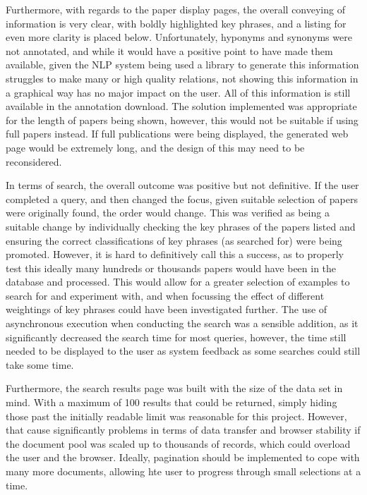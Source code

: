 Furthermore, with regards to the paper display pages, the overall conveying of information is very clear, with boldly highlighted key phrases, and a listing for even more clarity is placed below. Unfortunately, hyponyms and synonyms were not annotated, and while it would have a positive point to have made them available, given the NLP system being used a library to generate this information struggles to make many or high quality relations, not showing this information in a graphical way has no major impact on the user. All of this information is still available in the annotation download. The solution implemented was appropriate for the length of papers being shown, however, this would not be suitable if using full papers instead. If full publications were being displayed, the generated web page would be extremely long, and the design of this may need to be reconsidered.

In terms of search, the overall outcome was positive but not definitive. If the user completed a query, and then changed the focus, given suitable selection of papers were originally found, the order would change. This was verified as being a suitable change by individually checking the key phrases of the papers listed and ensuring the correct classifications of key phrases (as searched for) were being promoted. However, it is hard to definitively call this a success, as to properly test this ideally many hundreds or thousands papers would have been in the database and processed. This would allow for a greater selection of examples to search for and experiment with, and when focussing the effect of different weightings of key phrases could have been investigated further. The use of asynchronous execution when conducting the search was a sensible addition, as it significantly decreased the search time for most queries, however, the time still needed to be displayed to the user as system feedback as some searches could still take some time. 

Furthermore, the search results page was built with the size of the data set in mind. With a maximum of 100 results that could be returned, simply hiding those past the initially readable limit was reasonable for this project. However, that cause significantly problems in terms of data transfer and browser stability if the document pool was scaled up to thousands of records, which could overload the user and the browser. Ideally, pagination should be implemented to cope with many more documents, allowing hte user to progress through small selections at a time.

